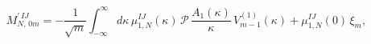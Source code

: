 \begin{equation}
M_{N,\,0m}^{\prime\,IJ}=-\frac{1}{\sqrt{m}}\int_{-\infty}^{\infty}d\kappa\,
\mu_{1,N}^{IJ}(\kappa)\,\mathscr{P}\,\frac{A_1(\kappa)}{\kappa}\,
V_{m-1}^{(1)}(\kappa)
+\mu_{1,N}^{IJ}(0)\,\xi_m,
\label{int1}
\end{equation}

